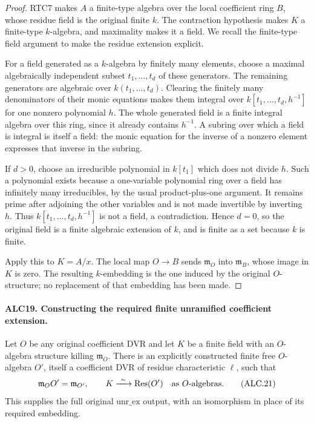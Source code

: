 \begin{proof}
RTC7 makes \(A\) a finite-type algebra over the local
coefficient ring \(B\), whose residue field is the original
finite \(k\).  The contraction hypothesis makes \(K\)
a finite-type \(k\)-algebra, and maximality makes it a
field.  We recall the finite-type field argument to make
the residue extension explicit.

For a field generated as a \(k\)-algebra by finitely many
elements, choose a maximal algebraically independent subset
\(t_1,\ldots,t_d\) of these generators.  The remaining
generators are algebraic over \(k(t_1,\ldots,t_d)\).
Clearing the finitely many denominators of their monic
equations makes them integral over
\(k[t_1,\ldots,t_d,h^{-1}]\) for one nonzero polynomial
\(h\).  The whole generated field is a finite integral
algebra over this ring, since it already contains \(h^{-1}\).
A subring over which a field is integral is itself a field:
the monic equation for the inverse of a nonzero element
expresses that inverse in the subring.

If \(d>0\), choose an irreducible polynomial in \(k[t_1]\)
which does not divide \(h\).  Such a polynomial exists
because a one-variable polynomial ring over a field has
infinitely many irreducibles, by the usual product-plus-one
argument.  It remains prime after adjoining the other
variables and is not made invertible by inverting \(h\).
Thus \(k[t_1,\ldots,t_d,h^{-1}]\) is not a field, a
contradiction.  Hence \(d=0\), so the original field is
a finite algebraic extension of \(k\), and is finite as
a set because \(k\) is finite.

Apply this to \(K=A/x\).  The local map \(O\to B\)
sends \(\mathfrak m_O\) into \(\mathfrak m_B\), whose
image in \(K\) is zero.  The resulting \(k\)-embedding
is the one induced by the original \(O\)-structure; no
replacement of that embedding has been made.
\end{proof}

\paragraph{ALC19. Constructing the required finite unramified coefficient extension.}
\label{claim:ALC19}
Let \(O\) be any original coefficient DVR and let \(K\)
be a finite field with an \(O\)-algebra structure killing
\(\mathfrak m_O\).  There is an explicitly constructed
finite free \(O\)-algebra \(O'\), itself a coefficient
DVR of residue characteristic \(\ell\), such that
\[
 \mathfrak m_OO'=\mathfrak m_{O'},\qquad
              K\xrightarrow{\ \sim\ }\operatorname{Res}(O')
                  \quad\hbox{as \(O\)-algebras}.
                                                        \tag{ALC.21}
\]
This supplies the full original \(\mathrm{unr\_ex}\)
output, with an isomorphism in place of its required embedding.

